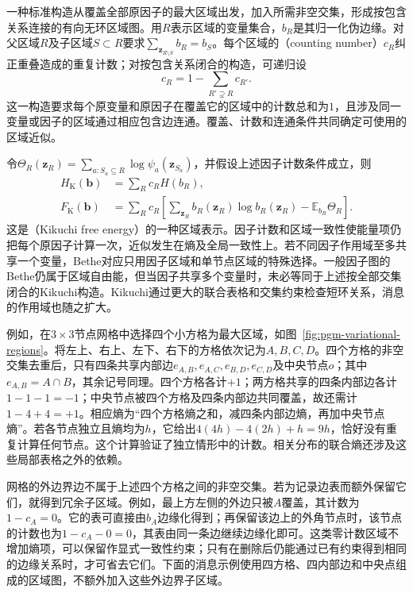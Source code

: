 一种标准构造从覆盖全部原因子的最大区域出发，加入所需非空交集，形成按包含关系连接的有向无环区域图。用$R$表示区域的变量集合，$b_R$是其归一化伪边缘。对父区域$R$及子区域$S\subset R$要求$\sum_{\bm z_{R\setminus S}}b_R=b_S$。每个区域的（counting number）$c_R$纠正重叠造成的重复计数；对按包含关系闭合的构造，可递归设
\begin{equation}
  c_R=1-\sum_{R'\supsetneq R}c_{R'}.
  \label{eq:pgm-variational-counting}
\end{equation}
这一构造要求每个原变量和原因子在覆盖它的区域中的计数总和为$1$，且涉及同一变量或因子的区域通过相应包含边连通。覆盖、计数和连通条件共同确定可使用的区域近似。

令$\Theta_R(\bm z_R)=\sum_{a:S_a\subseteq R}\log\psi_a(\bm z_{S_a})$，并假设上述因子计数条件成立，则
\begin{equation}
  \begin{aligned}
    H_{\mathrm K}(\bm b)&=\sum_R c_R H(b_R),\\
    F_{\mathrm K}(\bm b)
      &=\sum_R c_R\left[
          \sum_{\bm z_R}b_R(\bm z_R)\log b_R(\bm z_R)
          -\mathbb E_{b_R}\Theta_R\right].
  \end{aligned}
  \label{eq:pgm-variational-kikuchi}
\end{equation}
这是（Kikuchi free energy）的一种区域表示。因子计数和区域一致性使能量项仍把每个原因子计算一次，近似发生在熵及全局一致性上。若不同因子作用域至多共享一个变量，Bethe对应只用因子区域和单节点区域的特殊选择。一般因子图的Bethe仍属于区域自由能，但当因子共享多个变量时，未必等同于上述按全部交集闭合的Kikuchi构造。Kikuchi通过更大的联合表格和交集约束检查短环关系，消息的作用域也随之扩大。

例如，在$3\times3$节点网格中选择四个小方格为最大区域，如图~\ref{fig:pgm-variational-regions}。将左上、右上、左下、右下的方格依次记为$A,B,C,D$。四个方格的非空交集去重后，只有四条共享内部边$e_{A,B},e_{A,C},e_{B,D},e_{C,D}$及中央节点$o$；其中$e_{A,B}=A\cap B$，其余记号同理。四个方格各计$+1$；两方格共享的四条内部边各计$1-1-1=-1$；中央节点被四个方格及四条内部边共同覆盖，故还需计$1-4+4=+1$。相应熵为“四个方格熵之和，减四条内部边熵，再加中央节点熵”。若各节点独立且熵均为$h$，它给出$4(4h)-4(2h)+h=9h$，恰好没有重复计算任何节点。这个计算验证了独立情形中的计数。相关分布的联合熵还涉及这些局部表格之外的依赖。

网格的外边界边不属于上述四个方格之间的非空交集。若为记录边表而额外保留它们，就得到冗余子区域。例如，最上方左侧的外边只被$A$覆盖，其计数为$1-c_A=0$。它的表可直接由$b_A$边缘化得到；再保留该边上的外角节点时，该节点的计数也为$1-c_A-0=0$，其表由同一条边继续边缘化即可。这类零计数区域不增加熵项，可以保留作显式一致性约束；只有在删除后仍能通过已有约束得到相同的边缘关系时，才可省去它们。下面的消息示例使用四方格、四内部边和中央点组成的区域图，不额外加入这些外边界子区域。

